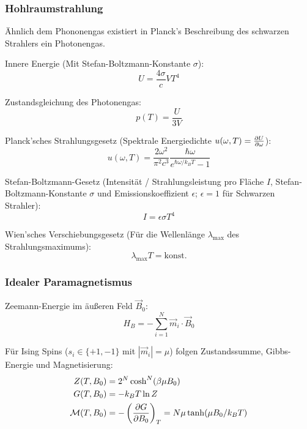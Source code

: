 \documentclass[11pt]{article}
\numberwithin{equation}{section}
\begin{document}
      \subsubsection{Hohlraumstrahlung}
        Ähnlich dem Phononengas existiert in Planck's Beschreibung des schwarzen Strahlers ein Photonengas. \vsp

        Innere Energie (Mit Stefan-Boltzmann-Konstante $\sigma$):
        \begin{equation}
          U = \frac{4\sigma}{c} V T^4
        \end{equation}

        Zustandsgleichung des Photonengas:
        \begin{equation}
          p(T) = \frac{U}{3V}
        \end{equation}

        Planck'sches Strahlungsgesetz (Spektrale Energiedichte $u(\omega,T) = \frac{\partial U}{\partial \omega}$):
        \begin{equation}
          u(\omega,T) = \frac{2 \omega^2}{\pi^2 c^3} \frac{\hbar \omega}{e^{\hbar \omega / k_B T} - 1}
        \end{equation}

        Stefan-Boltzmann-Gesetz (Intensität / Strahlungsleistung pro Fläche $I$, Stefan-Boltzmann-Konstante $\sigma$ und Emissionskoeffizient $\epsilon$; $\epsilon=1$ für Schwarzen Strahler):
        \begin{equation}
          I = \epsilon\sigma T^4
        \end{equation}

        Wien'sches Verschiebungsgesetz (Für die Wellenlänge $\lambda_{\max}$ des Strahlungsmaximums):
        \begin{equation}
          \lambda_{\max} T = \mathrm{konst}.
        \end{equation}

      \subsubsection{Idealer Paramagnetismus}
        Zeemann-Energie im äußeren Feld $\vec{B}_0$:
        \begin{equation}
          H_B = -\sum_{i=1}^N \vec{m}_i \cdot \vec{B}_0
        \end{equation}

        Für Ising Spins ($s_i\in\lbrace +1, -1\rbrace$ mit $|\vec{m}_i| = \mu$) folgen Zustandssumme, Gibbs-Energie und Magnetisierung:
        \begin{equation}
          \begin{aligned}
            Z(T,B_0) &= 2^N \cosh^N (\beta\mu B_0) \\
            G(T,B_0) &= -k_B T \ln Z \\
            \mathcal{M}(T,B_0) &= -\left(\frac{\partial G}{\partial B_0}\right)_T = N\mu \tanh(\mu B_0 /k_B T)
          \end{aligned}
        \end{equation}
\end{document}
